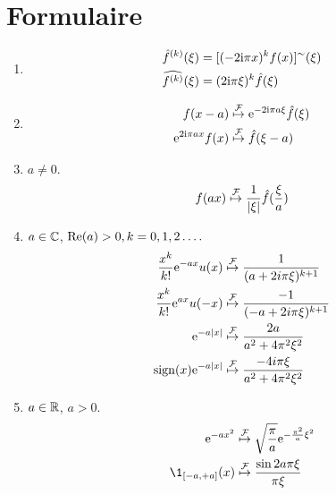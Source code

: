 \section{Formulaire}
\begin{enumerate}[label=(\roman*)]
\item
\begin{align*}
\hat{f}^{(k)}(\xi)&=[(-2\mathrm{i}\pi x)^{k}f(x)]^{\sim}(\xi)\\
\widehat{f^{(k)}}(\xi)&=(2\mathrm{i} \pi\xi)^{k}\hat{f}(\xi)
\end{align*}
\item
\begin{align*}
f(x-a) &\stackrel{\mathcal{F}}{\mapsto} \mathrm{e}^{-2\mathrm{i} \pi a\xi}\hat{f}(\xi) \\
\mathrm{e}^{2 \mathrm{i} \pi ax}f(x)&\stackrel{\mathcal{F}}{\mapsto} \hat{f}(\xi-a) \\
\end{align*}
\item $a\neq 0$.
$$ f(ax)\stackrel{\mathcal{F}}{\mapsto} \frac{1}{|\xi|}\hat{f}(\frac{\xi}{a})$$
\item  $a\in \mathbb{C}$, ${\rm Re}(a)>0, k=0,1,2\ldots.$
\begin{align*}
\frac{x^{k}}{k!}\mathrm{e}^{-ax}u(x) &\stackrel{\mathcal{F}}{\mapsto} \frac{1}{(a+2i\pi\xi)^{k+1}} \\
\frac{x^{k}}{k!}\mathrm{e}^{ax}u(-x) &\stackrel{\mathcal{F}}{\mapsto} \frac{-1}{(-a+2i\pi\xi)^{k+1}} \\
\mathrm{e}^{-a|x|} &\stackrel{\mathcal{F}}{\mapsto} \frac{2a}{a^{2}+4\pi^{2}\xi^{2}} \\
\mathrm{sign}(x)\mathrm{e}^{-a|x|} &\stackrel{\mathcal{F}}{\mapsto} \frac{-4i\pi\xi}{a^{2}+4\pi^{2}\xi^{2}} \\
\end{align*}
\item  $a\in \mathbb{R}$, $a>0$.
\begin{align*}
\rme^{-ax^{2}}  &\TFyield \sqrt{\frac{\pi}{a}}\rme^{-\frac{\pi^{2}}{a}\xi^{2}} \\
\1_{\ccint{-a,+a}}(x) &\TFyield \frac{\sin 2a\pi\xi}{\pi\xi}
\end{align*}
\end{enumerate}
